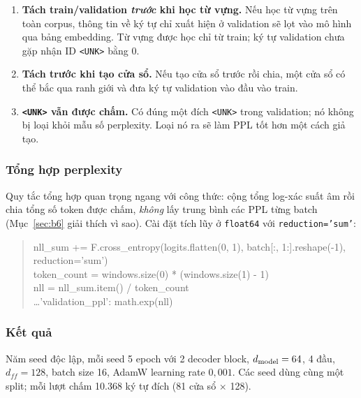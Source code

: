 \begin{enumerate}[leftmargin=2em]
\item \textbf{Tách train/validation \emph{trước} khi học từ vựng.} Nếu học từ vựng
trên toàn corpus, thông tin về ký tự chỉ xuất hiện ở validation sẽ lọt vào mô hình
qua bảng embedding. Từ vựng được học chỉ từ train; ký tự validation chưa gặp nhận
ID \texttt{<UNK>} bằng $0$.
\item \textbf{Tách trước khi tạo cửa sổ.} Nếu tạo cửa sổ trước rồi chia, một cửa sổ
có thể bắc qua ranh giới và đưa ký tự validation vào đầu vào train.
\item \textbf{\texttt{<UNK>} vẫn được chấm.} Có đúng một đích \texttt{<UNK>} trong
validation; nó không bị loại khỏi mẫu số perplexity. Loại nó ra sẽ làm PPL tốt hơn
một cách giả tạo.
\end{enumerate}

\subsubsection{Tổng hợp perplexity}

Quy tắc tổng hợp quan trọng ngang với công thức: cộng tổng log-xác suất âm rồi chia
tổng số token được chấm, \emph{không} lấy trung bình các PPL từng batch
(Mục~\ref{sec:b6} giải thích vì sao). Cài đặt tích lũy ở \texttt{float64} với
\texttt{reduction='sum'}:

\begin{quote}\small\ttfamily
nll\_sum += F.cross\_entropy(logits.flatten(0, 1), batch[:, 1:].reshape(-1),\\
\hspace*{6em}reduction='sum')\\
token\_count = windows.size(0) * (windows.size(1) - 1)\\
nll = nll\_sum.item() / token\_count\\
\ldots 'validation\_ppl': math.exp(nll)
\end{quote}

\subsubsection{Kết quả \dalam}

Năm seed độc lập, mỗi seed 5 epoch với 2 decoder block, $d_{\mathrm{model}}=64$, 4 đầu,
$d_{ff}=128$, batch size 16, AdamW learning rate $0{,}001$. Các seed dùng cùng một
split; mỗi lượt chấm 10.368 ký tự đích (81 cửa sổ $\times$ 128).

